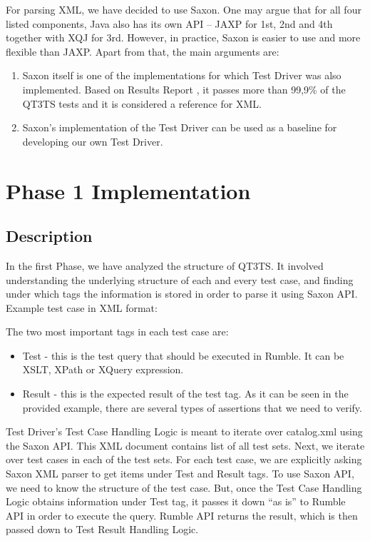 For parsing XML, we have decided to use Saxon. One may argue that for all four listed components, Java also has its own API – JAXP for 1st, 2nd and 4th together with XQJ for 3rd. However, in practice, Saxon is easier to use and more flexible than JAXP. Apart from that, the main arguments are:
\begin{enumerate}
	\item Saxon itself is one of the implementations for which Test Driver was also implemented. Based on Results Report \cite{SaxonReport}, it passes more than 99,9\% of the QT3TS tests and it is considered a reference for XML.
	\item Saxon's implementation of the Test Driver can be used as a baseline for developing our own Test Driver. 
\end{enumerate}

\section{Phase 1 Implementation}
\subsection{Description}
\label{Phase1_Description}
In the first Phase, we have analyzed the structure of QT3TS. It involved understanding the underlying structure of each and every test case, and finding under which tags the information is stored in order to parse it using Saxon API. Example test case in XML format:



The two most important tags in each test case are:
\begin{itemize}
	\item Test  - this is the test query that should be executed in Rumble. It can be XSLT, XPath or XQuery expression.
	\item Result - this is the expected result of the test tag. As it can be seen in the provided example, there are several types of assertions that we need to verify.
\end{itemize}

Test Driver's Test Case Handling Logic is meant to iterate over catalog.xml using the Saxon API. This XML document contains list of all test sets. Next, we iterate over test cases in each of the test sets. For each test case, we are explicitly asking Saxon XML parser to get items under Test and Result tags. To use Saxon API, we need to know the structure of the test case. But, once the Test Case Handling Logic obtains information under Test tag, it passes it down ``as is'' to Rumble API in order to execute the query. Rumble API returns the result, which is then passed down to Test Result Handling Logic. 

